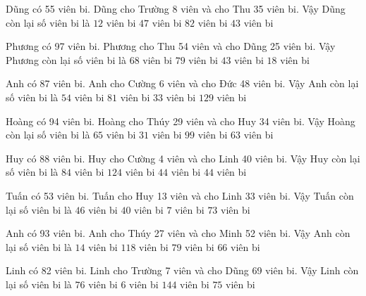 \documentclass[12pt,a4paper]{article}
\begin{document}
\begin{ex}
Dũng có 55 viên bi. Dũng cho Trường 8 viên và cho Thu 35 viên bi. Vậy Dũng còn lại số viên bi là
 \choice 
{\True $12$ viên bi}
{$47$ viên bi}
{$82$ viên bi}
{$43$ viên bi}
\end{ex}
\begin{ex}
Phương có 97 viên bi. Phương cho Thu 54 viên và cho Dũng 25 viên bi. Vậy Phương còn lại số viên bi là
 \choice 
{$68$ viên bi}
{$79$ viên bi}
{$43$ viên bi}
{\True $18$ viên bi}
\end{ex}
\begin{ex}
Anh có 87 viên bi. Anh cho Cường 6 viên và cho Đức 48 viên bi. Vậy Anh còn lại số viên bi là
 \choice 
{$54$ viên bi}
{$81$ viên bi}
{\True $33$ viên bi}
{$129$ viên bi}
\end{ex}
\begin{ex}
Hoàng có 94 viên bi. Hoàng cho Thúy 29 viên và cho Huy 34 viên bi. Vậy Hoàng còn lại số viên bi là
 \choice 
{$65$ viên bi}
{\True $31$ viên bi}
{$99$ viên bi}
{$63$ viên bi}
\end{ex}
\begin{ex}
Huy có 88 viên bi. Huy cho Cường 4 viên và cho Linh 40 viên bi. Vậy Huy còn lại số viên bi là
 \choice 
{$84$ viên bi}
{$124$ viên bi}
{\True $44$ viên bi}
{\True $44$ viên bi}
\end{ex}
\begin{ex}
Tuấn có 53 viên bi. Tuấn cho Huy 13 viên và cho Linh 33 viên bi. Vậy Tuấn còn lại số viên bi là
 \choice 
{$46$ viên bi}
{$40$ viên bi}
{\True $7$ viên bi}
{$73$ viên bi}
\end{ex}
\begin{ex}
Anh có 93 viên bi. Anh cho Thúy 27 viên và cho Minh 52 viên bi. Vậy Anh còn lại số viên bi là
 \choice 
{\True $14$ viên bi}
{$118$ viên bi}
{$79$ viên bi}
{$66$ viên bi}
\end{ex}
\begin{ex}
Linh có 82 viên bi. Linh cho Trường 7 viên và cho Dũng 69 viên bi. Vậy Linh còn lại số viên bi là
 \choice 
{$76$ viên bi}
{\True $6$ viên bi}
{$144$ viên bi}
{$75$ viên bi}
\end{ex}
\end{document}
